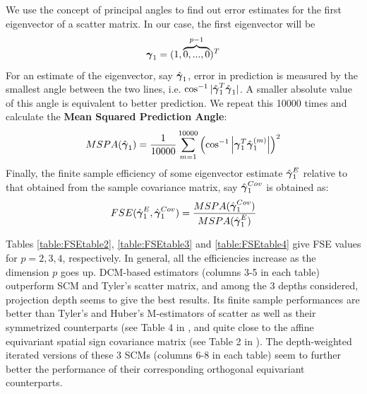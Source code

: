 We use the concept of principal angles \citep{miao92} to find out error estimates for the first eigenvector of a scatter matrix. In our case, the first eigenvector will be
%
$$ {\boldsymbol{\gamma}}_1 = (1,\overbrace{0,...,0}^{p-1})^T $$
%
For an estimate of the eigenvector, say $\hat{{\boldsymbol{\gamma}}}_1$, error in prediction is measured by the smallest angle between the two lines, i.e. $ \cos^{-1} | \hat{{\boldsymbol{\gamma}}}_1^T \hat{{\boldsymbol{\gamma}}}_1 | $. A smaller absolute value of this angle is equivalent to better prediction. We repeat this 10000 times and calculate the \textbf{Mean Squared Prediction Angle}:
%
$$ MSPA(\hat {{\boldsymbol{\gamma}}}_1) = \frac{1}{10000} \sum_{m=1}^{10000} \left( \cos^{-1} \left|{\boldsymbol{\gamma}}_1^T \hat{{\boldsymbol{\gamma}}}^{(m)}_1 \right| \right)^2 $$
%
Finally, the finite sample efficiency of some eigenvector estimate $\hat{{\boldsymbol{\gamma}}}^E_1$ relative to that obtained from the sample covariance matrix, say $\hat{{\boldsymbol{\gamma}}}^{Cov}_1$ is obtained as:
$$ FSE(\hat{{\boldsymbol{\gamma}}}^E_1, \hat{{\boldsymbol{\gamma}}}^{Cov}_1) = \frac{MSPA(\hat{{\boldsymbol{\gamma}}}^{Cov}_1)}{MSPA(\hat{{\boldsymbol{\gamma}}}^E_1)} $$

Tables \ref{table:FSEtable2}, \ref{table:FSEtable3} and \ref{table:FSEtable4} give FSE values for $p=2,3,4$, respectively. In general, all the efficiencies increase as the dimension $p$ goes up. DCM-based estimators (columns 3-5 in each table) outperform SCM and Tyler's scatter matrix, and among the 3 depths considered, projection depth seems to give the best results. Its finite sample performances are better than Tyler's and Huber's M-estimators of scatter as well as their symmetrized counterparts (see Table 4 in \cite{sirkia07}, and quite close to the affine equivariant spatial sign covariance matrix (see Table 2 in \cite{ollilia03}). The depth-weighted iterated versions of these 3 SCMs (columns 6-8 in each table) seem to further better the performance of their corresponding orthogonal equivariant counterparts.

